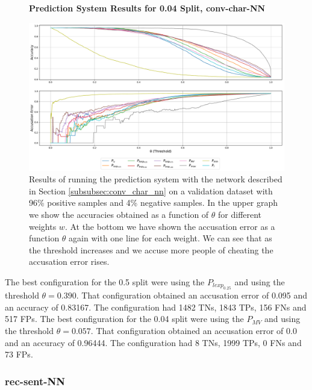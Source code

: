 \begin{figure}
    \centering
    \textbf{Prediction System Results for 0.04 Split, \glsdesc{conv-char-NN}}\par\medskip
    \includegraphics[scale=0.33]{./pictures/experiments/conv_char_nn/prediction_system_04}
    \caption{Results of running the prediction system with the network described
        in Section \ref{subsubsec:conv_char_nn} on a validation dataset with
        96\% positive samples and 4\% negative samples. In the upper graph we
        show the accuracies obtained as a function of $\theta$ for different
        weights $w$. At the bottom we have shown the accusation error as a
        function $\theta$ again with one line for each weight. We can see that
        as the threshold increases and we accuse more people of cheating the
        accusation error rises.}
    \label{fig:conv-char-NN-pred-4}
\end{figure}

The best configuration for the 0.5 split were using the $P_{lexp_{0.25}}$ and
using the threshold $\theta = 0.390$. That configuration obtained an accusation
error of 0.095 and an accuracy of 0.83167. The configuration had 1482 \gls{TN}s,
1843 \gls{TP}s, 156 \gls{FN}s and 517 \gls{FP}s. The best configuration for the
0.04 split were using the $P_{MV}$ and using the threshold $\theta = 0.057$.
That configuration obtained an accusation error of 0.0 and an accuracy of
0.96444. The configuration had 8 \gls{TN}s, 1999 \gls{TP}s, 0 \gls{FN}s and 73
\gls{FP}s.


\subsubsection{\glsdesc{rec-sent-NN}}
\label{subsubsec:prediction_system_rec-sent-NN}

